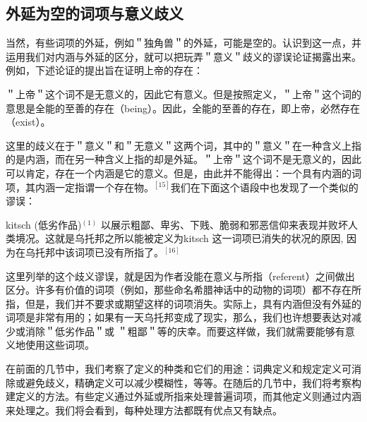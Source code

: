 \subsection{外延为空的词项与意义歧义}

当然，有些词项的外延，例如＂独角兽＂的外延，可能是空的。认识到这一点，并运用我们对内涵与外延的区分，就可以把玩弄＂意义＂歧义的谬误论证揭露出来。例如，下述论证的提出旨在证明上帝的存在：

\begin{displayquote}
＂上帝＂这个词不是无意义的，因此它有意义。但是按照定义，＂上帝＂这个词的意思是全能的至善的存在（being）。因此，全能的至善的存在，即上帝，必然存在（exist）。
\end{displayquote}

这里的歧义在于＂意义＂和＂无意义＂这两个词，其中的＂意义＂在一种含义上指的是内涵，而在另一种含义上指的却是外延。＂上帝＂这个词不是无意义的，因此可以肯定，存在一个内涵是它的意义。但是，由此并不能得出：一个具有内涵的词项，其内涵一定指谓一个存在物。$^{[15]}$我们在下面这个语段中也发现了一个类似的谬误：

\begin{displayquote}
kitsch (低劣作品)$^{(1)}$ 以展示粗鄙、卑劣、下贱、脆弱和邪恶信仰来表现并败坏人类境况。这就是乌托邦之所以能被定义为kitsch 这一词项已消失的状况的原因, 因为在乌托邦中该词项已没有所指了。$^{[16]}$
\end{displayquote}

这里列举的这个歧义谬误，就是因为作者没能在意义与所指（referent）之间做出区分。许多有价值的词项（例如，那些命名希腊神话中的动物的词项）都不存在所指，但是，我们并不要求或期望这样的词项消失。实际上，具有内涵但没有外延的词项是非常有用的；如果有一天乌托邦变成了现实，那么，我们也许想要表达对减少或消除＂低劣作品＂或 ＂粗鄙＂等的庆幸。而要这样做，我们就需要能够有意义地使用这些词项。

在前面的几节中，我们考察了定义的种类和它们的用途：词典定义和规定定义可消除或避免歧义，精确定义可以减少模糊性，等等。在随后的几节中，我们将考察构建定义的方法。有些定义通过外延或所指来处理普遍词项，而其他定义则通过内涵来处理之。我们将会看到，每种处理方法都既有优点又有缺点。

\begin{center}
\end{center} 